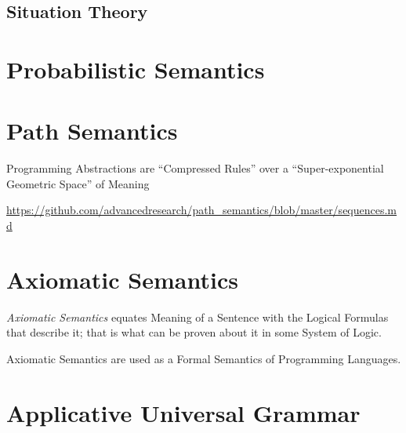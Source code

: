 \subsection{Situation Theory}\label{sec:situation_theory}



\section{Probabilistic Semantics}\label{sec:probabilistic_semantics}

\section{Path Semantics}\label{sec:path_semantics}

Programming Abstractions are ``Compressed Rules'' over a
``Super-exponential Geometric Space'' of Meaning

\url{https://github.com/advancedresearch/path_semantics/blob/master/sequences.md}



\section{Axiomatic Semantics}\label{sec:axiomatic_semantics}

\emph{Axiomatic Semantics} equates Meaning of a Sentence with the
Logical Formulas that describe it; that is what can be proven about it
in some System of Logic.

Axiomatic Semantics are used as a Formal Semantics of Programming
Languages.



\section{Applicative Universal Grammar}
\label{sec:applicative_universal_grammar}

